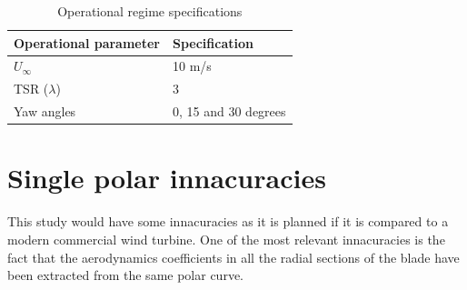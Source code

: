 \begin{table}[htbp]
\centering
\caption{Operational regime specifications}
\begin{tabular}{|l|l|} 
\hline
\textbf{Operational parameter} & \textbf{Specification}  \\ 
\hline
$U_{\infty}$                    & 10 m/s                  \\ 
\hline
TSR  ($\lambda$)                   & 3                       \\ 
\hline
Yaw angles                     & 0, 15 and 30 degrees    \\
\hline
\end{tabular}
\label{Op_specs}
\end{table}


\section{Single polar innacuracies}

This study would have some innacuracies as it is planned if it is compared to a modern commercial wind turbine. One of the most relevant innacuracies is the fact that the aerodynamics coefficients in all the radial sections of the blade have been extracted from the same polar curve. \\

